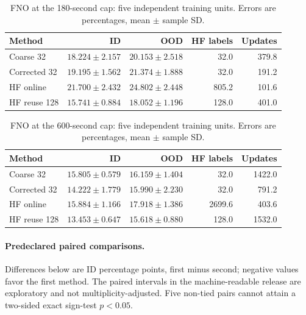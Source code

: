 \begin{table}[ht]\centering\small

\caption{FNO at the 180-second cap: five independent training units. Errors are percentages, mean $\pm$ sample SD.}

\begin{tabular}{lrrrr}\toprule Method & ID & OOD & HF labels & Updates\\\midrule

Coarse 32 & $18.224\pm2.157$ & $20.153\pm2.518$ & 32.0 & 379.8\\

Corrected 32 & $19.195\pm1.562$ & $21.374\pm1.888$ & 32.0 & 191.2\\

HF online & $21.700\pm2.432$ & $24.802\pm2.448$ & 805.2 & 101.6\\

HF reuse 128 & $15.741\pm0.884$ & $18.052\pm1.196$ & 128.0 & 401.0\\

\bottomrule\end{tabular}\end{table}

\begin{table}[ht]\centering\small

\caption{FNO at the 600-second cap: five independent training units. Errors are percentages, mean $\pm$ sample SD.}

\begin{tabular}{lrrrr}\toprule Method & ID & OOD & HF labels & Updates\\\midrule

Coarse 32 & $15.805\pm0.579$ & $16.159\pm1.404$ & 32.0 & 1422.0\\

Corrected 32 & $14.222\pm1.779$ & $15.990\pm2.230$ & 32.0 & 791.2\\

HF online & $15.884\pm1.166$ & $17.918\pm1.386$ & 2699.6 & 403.6\\

HF reuse 128 & $13.453\pm0.647$ & $15.618\pm0.880$ & 128.0 & 1532.0\\

\bottomrule\end{tabular}\end{table}

\paragraph{Predeclared paired comparisons.} Differences below are ID percentage points, first minus second; negative values favor the first method. The paired intervals in the machine-readable release are exploratory and not multiplicity-adjusted. Five non-tied pairs cannot attain a two-sided exact sign-test $p<0.05$.

